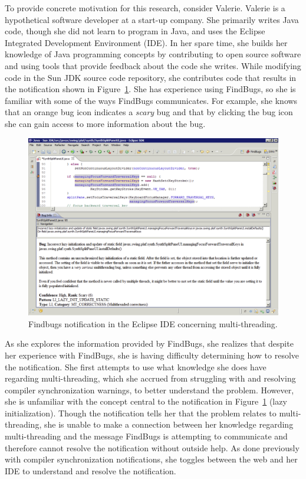 \vspace{1em}

To provide concrete motivation for this research, consider Valerie. Valerie is a hypothetical software developer at a start-up company. She primarily writes Java code, though she did not learn to program in Java, and uses the Eclipse Integrated Development Environment (IDE). In her spare time, she builds her knowledge of Java programming concepts by contributing to open source software and using tools that provide feedback about the code she writes. While modifying code in the Sun JDK source code repository, she contributes code that results in the notification shown in Figure~\ref{fig:eclipse}. She has experience using FindBugs, so she is familiar with some of the ways FindBugs communicates. For example, she knows that an orange bug icon indicates a \textit{scary} bug and that by clicking the bug icon she can gain access to more information about the bug.

\begin{figure}
	\centering
	\includegraphics[width=\textwidth]{Chapter-2/figs/eclipse.png}
	\caption{Findbugs notification in the Eclipse IDE concerning multi-threading.}
	\label{fig:eclipse}
\end{figure} 

As she explores the information provided by FindBugs, she realizes that despite her experience with FindBugs, she is having difficulty determining how to resolve the notification. She first attempts to use what knowledge she does have regarding multi-threading, which she accrued from struggling with and resolving compiler synchronization warnings, to better understand the problem. 
However, she is unfamiliar with the concept central to the notification in Figure~\ref{fig:eclipse} (lazy initialization). Though the notification tells her that the problem relates to multi-threading, she is unable to make a connection between her knowledge regarding multi-threading and the message FindBugs is attempting to communicate and therefore cannot resolve the notification without outside help. As done previously with compiler synchronization notifications, she toggles between the web and her IDE to understand and resolve the notification.

